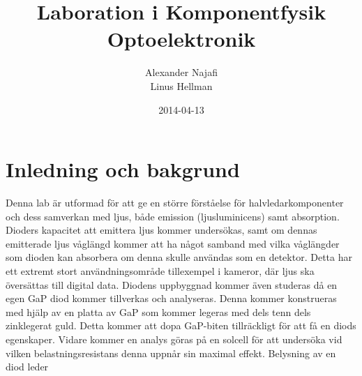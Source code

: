\documentclass[a4paper]{article}
\title{Laboration i Komponentfysik\\ Optoelektronik}
\author{Alexander Najafi \\ Linus Hellman}
\date{2014-04-13}
\begin{document}
\maketitle
\thispagestyle{empty}
\newpage

\tableofcontents
\newpage

\section{Inledning och bakgrund}

Denna lab är utformad för att ge en större förståelse för halvledarkomponenter och dess samverkan med ljus, både emission (ljusluminicens) samt absorption. Dioders kapacitet att emittera ljus kommer undersökas, samt om dennas emitterade ljus våglängd kommer att ha något samband med vilka våglängder som dioden kan absorbera om denna skulle användas som en detektor. Detta har ett extremt stort användningsområde tillexempel i kameror, där ljus ska översättas till digital data. Diodens uppbyggnad kommer även studeras då en egen GaP diod kommer tillverkas och analyseras. Denna kommer konstrueras med hjälp av en platta av GaP som kommer legeras med dels tenn dels zinklegerat guld. Detta kommer att dopa GaP-biten tillräckligt för att få en diods egenskaper. Vidare kommer en analys göras på en solcell för att undersöka vid vilken belastningsresistans denna uppnår sin maximal effekt. Belysning av en diod leder 
\end{document}
